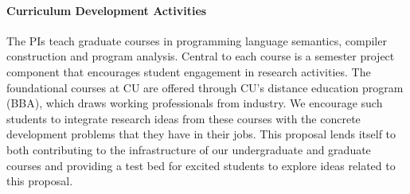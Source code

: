 
\paragraph{Curriculum Development Activities}

The PIs teach graduate courses in programming language semantics,
compiler construction and program analysis. Central to each course is
a semester project component that encourages student engagement in
research activities. The foundational
courses at CU are offered through CU's distance education program
(BBA), which draws working professionals from industry. We encourage
such students to integrate research ideas from these courses with the
concrete development problems that they have in their jobs.  This
proposal lends itself to both contributing to the infrastructure of
our undergraduate and graduate courses and providing a test bed for excited students to explore ideas related to this proposal. 






%

